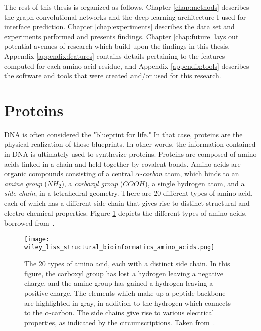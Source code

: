 The rest of this thesis is organized as follows.
Chapter \ref{chap:methods} describes the graph convolutional networks and the deep learning architecture I used for interface prediction.
Chapter \ref{chap:experiments} describes the data set and experiments performed and presents findings. 
Chapter \ref{chap:future} lays out potential avenues of research which build upon the findings in this thesis. 
Appendix \ref{appendix:features} contains details pertaining to the features computed for each amino acid residue, and Appendix \ref{appendix:tools} describes the software and tools that were created and/or used for this research.

\section{Proteins}

DNA is often considered the "blueprint for life." 
In that case, proteins are the physical realization of those blueprints.
In other words, the information contained in DNA is ultimately used to synthesize proteins.
Proteins are composed of amino acids linked in a chain and held together by covalent bonds.
Amino acids are organic compounds consisting of a central \textit{$\alpha$-carbon} atom, which binds to an \textit{amine group} ($NH_2$), a \textit{carboxyl group} ($COOH$), a single hydrogen atom, and a \textit{side chain}, in a tetrahedral geometry.
There are 20 different types of amino acid, each of which has a different side chain that gives rise to distinct structural and electro-chemical properties.
Figure \ref{fig:aminoacids} depicts the different types of amino acids, borrowed from~\cite{scheeffink2003}.


\begin{figure}
	\centering
	\texttt{[image: wiley\_liss\_structural\_bioinformatics\_amino\_acids.png]}
	\caption{The 20 types of amino acid, each with a distinct side chain. In this figure, the carboxyl group has lost a hydrogen leaving a negative charge, and the amine group has gained a hydrogen leaving a positive charge. The elements which make up a peptide backbone are highlighted in gray, in addition to the hydrogen which connects to the $\alpha$-carbon. The side chains give rise to various electrical properties, as indicated by the circumscriptions. Taken from~\cite{scheeffink2003}.}
	\label{fig:aminoacids}
\end{figure}


